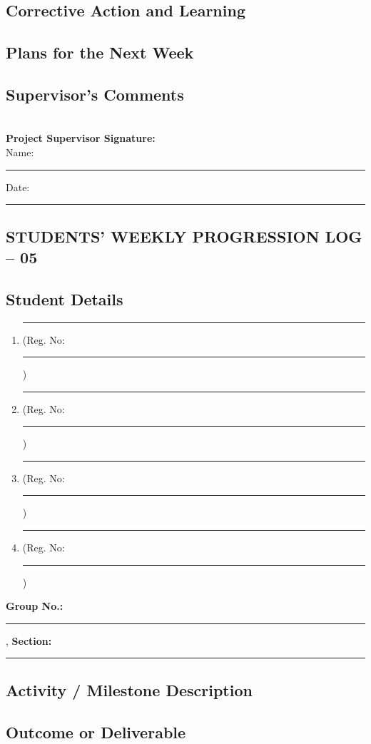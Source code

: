\documentclass[a4paper]{article}
\begin{document}
\subsection*{Corrective Action and Learning}
\framebox[\textwidth][c]{\rule{0pt}{4cm}}


\subsection*{Plans for the Next Week}
\framebox[\textwidth][c]{\rule{0pt}{4cm}}

\subsection*{Supervisor's Comments}
\framebox[\textwidth][c]{\rule{0pt}{4cm}}\\[2em]

\vfill
\textbf{Project Supervisor Signature:}\\[1em]
Name: \rule{6cm}{0.4pt} \hfill Date: \rule{4cm}{0.4pt}


\newpage
\begin{center}
\section*{STUDENTS' WEEKLY PROGRESSION LOG -- 05}
\end{center}
\subsection*{Student Details}
\begin{enumerate}[itemsep=0em]
\item \rule{8cm}{0.4pt} (Reg. No:\rule{2cm}{0.4pt})
\item \rule{8cm}{0.4pt} (Reg. No:\rule{2cm}{0.4pt})
\item \rule{8cm}{0.4pt} (Reg. No:\rule{2cm}{0.4pt})
\item \rule{8cm}{0.4pt} (Reg. No:\rule{2cm}{0.4pt})
\end{enumerate}
\textbf{Group No.:} \rule{4cm}{0.4pt}, \textbf{Section:} \rule{3.5cm}{0.4pt}

				 
\subsection*{Activity / Milestone Description}
\framebox[\textwidth][c]{\rule{0pt}{4cm}}

\subsection*{Outcome or Deliverable}
\framebox[\textwidth][c]{\rule{0pt}{4cm}}
\end{document}
